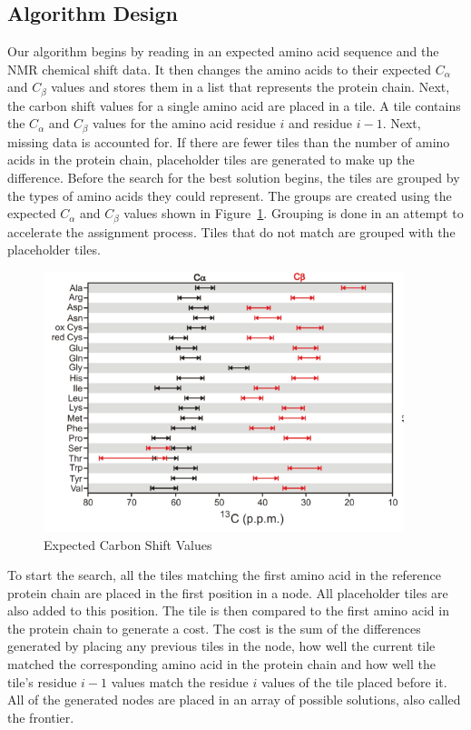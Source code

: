 \documentclass[12pt, letter]{article}
\begin{document}

\subsection{Algorithm Design} %
\label{sub:algorithm}
Our algorithm begins by reading in an expected amino acid sequence and the NMR chemical shift data. It then changes the amino acids to their expected $C_\alpha$ and $C_{\beta}$ values and stores them in a list that represents the protein chain. Next, the carbon shift values for a single amino acid are placed in a tile. A tile contains the $C_\alpha$ and $C_{\beta}$ values for the amino acid residue $i$ and residue $i-1$. Next, missing data is accounted for. If there are fewer tiles than the number of amino acids in the protein chain, placeholder tiles are generated to make up the difference. Before the search for the best solution begins, the tiles are grouped by the types of amino acids they could represent. The groups are created using the expected $C_\alpha$ and $C_{\beta}$ values shown in Figure~\ref{fig:carbon}. Grouping is done in an attempt to accelerate the assignment process. Tiles that do not match are grouped with the placeholder tiles. 

\begin{figure}[H]
\begin{center}
\includegraphics{carbon}
\end{center}
\caption{Expected Carbon Shift Values \cite{carbon}} %
\label{fig:carbon}
\end{figure}

To start the search,  all the tiles matching the first amino acid in the reference protein chain are placed in the first position in a node. All placeholder tiles are also added to this position. The tile is then compared to the first amino acid in the protein chain to generate a cost. The cost is the sum of the differences generated by placing any previous tiles in the node, how well the current tile matched the corresponding amino acid in the protein chain and how well the tile's residue $i-1$ values match the residue $i$ values of the tile placed before it. All of the generated nodes are placed in an array of possible solutions, also called the frontier. 
\end{document}
